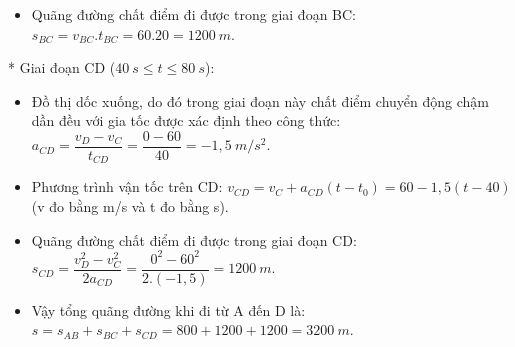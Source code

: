 \begin{vidu}
{\begin{itemize}
\item Quãng đường chất điểm đi được trong giai đoạn BC:
$s_{BC}=v_{BC}.t_{BC}=60.20=1200\ m$.
\end{itemize}
* Giai đoạn CD ($40\ s \le  t \le  80\ s$):
\begin{itemize}
\item Đồ thị dốc xuống, do đó trong giai đoạn này chất điểm chuyển động chậm dần đều với gia tốc được xác định theo công thức: $a_{CD}=\dfrac{v_D-v_C}{t_{CD}}=\dfrac{0-60}{40}=-1,5\ m/s^2$.
\item Phương trình vận tốc trên CD: $v_{CD}=v_C+a_{CD}\left(t-t_0\right)=60-1,5\left(t-40\right)$
(v đo bằng m/s và t đo bằng s).
\item Quãng đường chất điểm đi được trong giai đoạn CD:
$s_{CD}=\dfrac{v_D^2-v_C^2}{2a_{CD}}=\dfrac{0^2-60^2}{2.\left(-1,5\right)}=1200\ m$.
\item Vậy tổng quãng đường khi đi từ A đến D là:
$s=s_{AB}+s_{BC}+s_{CD}=800+1200+1200=3200\ m$.
\end{itemize}}
 \end{vidu}

\begin{vidu}

\loigiai{
}
 \end{vidu}




